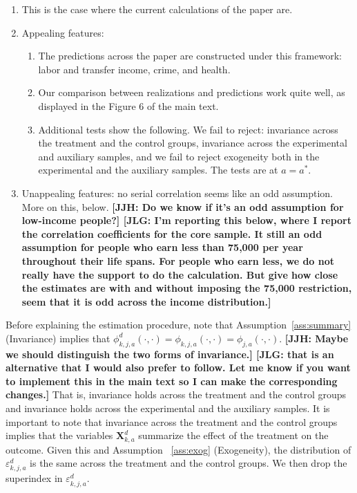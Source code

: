 \begin{enumerate}
 
\item This is the case where the current calculations of the paper are.
\item Appealing features:

\begin{enumerate}
\item The predictions across the paper are constructed under this framework: labor and transfer income, crime, and health. 
\item Our comparison between realizations and predictions work quite well, as displayed in the Figure 6 of the main text. 
\item Additional tests show the following. We fail to reject: invariance across the treatment and the control groups, invariance across the experimental and auxiliary samples, and we fail to reject exogeneity both in the experimental and the auxiliary samples.  The tests are at $a = a^*$.

\end{enumerate}
\item Unappealing features: no serial correlation seems like an odd assumption. More on this, below. \textbf{[JJH: Do we know if it's an odd assumption for low-income people?] [JLG: I'm reporting this below, where I report the correlation coefficients for the core sample. It still an odd assumption for people who earn less than 75,000 per year throughout their life spans. For people who earn less, we do not really have the support to do the calculation. But give how close the estimates are with and without imposing the 75,000 restriction, seem that it is odd across the income distribution.]}
\end{enumerate}

\noindent Before explaining the estimation procedure, note that Assumption~\ref{ass:summary} (Invariance) implies that $\phi_{k,j,a}^d \left (\cdot, \cdot \right) = \phi_{k,j,a}  \left (\cdot, \cdot \right) = \phi_{j,a}  \left (\cdot, \cdot \right)$. \textbf{[JJH: Maybe we should distinguish the two forms of invariance.] [JLG: that is an alternative that I would also prefer to follow. Let me know if you want to implement this in the main text so I can make the corresponding changes.]} That is, invariance holds across the treatment and the control groups and invariance holds across the experimental and the auxiliary samples. It is important to note that invariance across the treatment and the control groups implies that the variables $\bm{X}_{k,a}^d$ summarize the effect of the treatment on the outcome. Given this and Assumption ~\ref{ass:exog} (Exogeneity), the distribution of $\varepsilon_{k,j,a}^d$ is the same across the treatment and the control groups. We then drop the superindex in $\varepsilon_{k,j,a}^d$.\\ 

